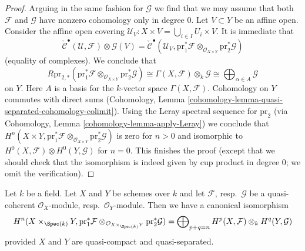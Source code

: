 \begin{proof}
\medskip\noindent
Arguing in the same fashion for $\mathcal{G}$ we find that we
may assume that both $\mathcal{F}$ and $\mathcal{G}$
have nonzero cohomology only in degree $0$.
Let $V \subset Y$ be an affine open. Consider the affine open covering
$\mathcal{U}_V : X \times V = \bigcup_{i \in I} U_i \times V$.
It is immediate that
$$
\check{\mathcal{C}}^\bullet(\mathcal{U}, \mathcal{F}) \otimes \mathcal{G}(V) =
\check{\mathcal{C}}^\bullet(\mathcal{U}_V,
\text{pr}_1^*\mathcal{F} \otimes_{\mathcal{O}_{X \times Y}}
\text{pr}_2^*\mathcal{G})
$$
(equality of complexes). We conclude that
$$
R\text{pr}_{2, *}(\text{pr}_1^*\mathcal{F} \otimes_{\mathcal{O}_{X \times Y}}
\text{pr}_2^*\mathcal{G})
\cong
\Gamma(X, \mathcal{F}) \otimes_k \mathcal{G} \cong
\bigoplus\nolimits_{\alpha \in A} \mathcal{G}
$$
on $Y$. Here $A$ is a basis for the $k$-vector space $\Gamma(X, \mathcal{F})$.
Cohomology on $Y$ commutes with direct sums
(Cohomology, Lemma \ref{cohomology-lemma-quasi-separated-cohomology-colimit}).
Using the Leray spectral sequence for $\text{pr}_2$
(via Cohomology, Lemma \ref{cohomology-lemma-apply-Leray})
we conclude that
$H^n(X \times Y, \text{pr}_1^*\mathcal{F} \otimes_{\mathcal{O}_{X \times Y}}
\text{pr}_2^*\mathcal{G})$
is zero for $n > 0$ and isomorphic to
$H^0(X, \mathcal{F}) \otimes H^0(Y, \mathcal{G})$ for $n = 0$.
This finishes the proof (except that we should check that the
isomorphism is indeed given by cup product in degree $0$; we omit
the verification).
\end{proof}

\begin{lemma}
\label{lemma-kunneth-general}
Let $k$ be a field. Let $X$ and $Y$ be schemes over $k$ and
let $\mathcal{F}$, resp.\ $\mathcal{G}$ be a quasi-coherent
$\mathcal{O}_X$-module, resp.\ $\mathcal{O}_Y$-module.
Then we have a canonical isomorphism
$$
H^n(X \times_{\Spec(k)} Y, \text{pr}_1^*\mathcal{F}
\otimes_{\mathcal{O}_{X \times_{\Spec(k)} Y}} \text{pr}_2^*\mathcal{G}) =
\bigoplus\nolimits_{p + q = n}
H^p(X, \mathcal{F}) \otimes_k H^q(Y, \mathcal{G})
$$
provided $X$ and $Y$ are quasi-compact and quasi-separated.
\end{lemma}

